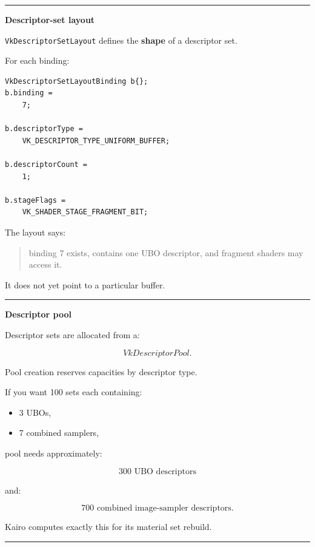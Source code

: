 \begin{center}\rule{0.5\linewidth}{0.5pt}\end{center}

\textbf{Descriptor-set layout}

\texttt{VkDescriptorSetLayout} defines the \textbf{shape} of a descriptor set.

For each binding:

\begin{verbatim}
VkDescriptorSetLayoutBinding b{};
b.binding =
    7;

b.descriptorType =
    VK_DESCRIPTOR_TYPE_UNIFORM_BUFFER;

b.descriptorCount =
    1;

b.stageFlags =
    VK_SHADER_STAGE_FRAGMENT_BIT;
\end{verbatim}

The layout says:

\begin{quote}
binding 7 exists, contains one UBO descriptor, and fragment shaders may access it.
\end{quote}

It does not yet point to a particular buffer.

\begin{center}\rule{0.5\linewidth}{0.5pt}\end{center}

\textbf{Descriptor pool}

Descriptor sets are allocated from a:

\[
VkDescriptorPool.
\]

Pool creation reserves capacities by descriptor type.

If you want 100 sets each containing:

\begin{itemize}
\tightlist
\item
  3 UBOs,
\item
  7 combined samplers,
\end{itemize}

pool needs approximately:

\[
300\text{ UBO descriptors}
\]

and:

\[
700\text{ combined image-sampler descriptors}.
\]

Kairo computes exactly this for its material set rebuild.

\begin{center}\rule{0.5\linewidth}{0.5pt}\end{center}

